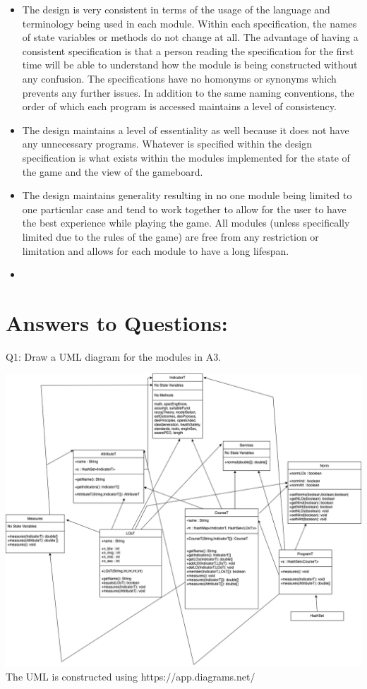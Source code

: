 \documentclass[12pt]{article}
\begin{document}
\begin{itemize}
  \item The design is very consistent in terms of the usage of the language and terminology being used in each module. Within each specification, the names
        of state variables or methods do not change at all. The advantage of having a consistent specification is that a person reading the specification for
        the first time will be able to understand how the module is being constructed without any confusion. The specifications have no homonyms or synonyms
        which prevents any further issues. In addition to the same naming conventions, the order of which each program is accessed maintains a level of
        consistency.
  \item The design maintains a level of essentiality as well because it does not have any unnecessary programs. Whatever is specified within the design
        specification is what exists within the modules implemented for the state of the game and the view of the gameboard.
  \item The design maintains generality resulting in no one module being limited to one particular case and tend to work together to allow for the user to
        have the best experience while playing the game. All modules (unless specifically limited due to the rules of the game) are free from any restriction
        or limitation and allows for each module to have a long lifespan.
  \item 
\end{itemize}

\section*{Answers to Questions:}

Q1: Draw a UML diagram for the modules in A3.

\begin{center}
  \includegraphics[scale = 0.3]{A3UMLsemi.png} \\
  The UML is constructed using https://app.diagrams.net/
\end{center}
\end{document}
